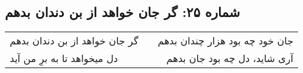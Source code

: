 \begin{center}
\section*{شماره ۲۵: گر جان خواهد از بن دندان بدهم}
\label{sec:025}
\begin{longtable}{l p{0.5cm} r}
گر جان خواهد از بن دندان بدهم
&&
جان خود چه بود هزار چندان بدهم
\\
دل میخواهد تا به برِ من آید
&&
آری شاید، دل چه بود جان بدهم
\\
\end{longtable}
\end{center}
